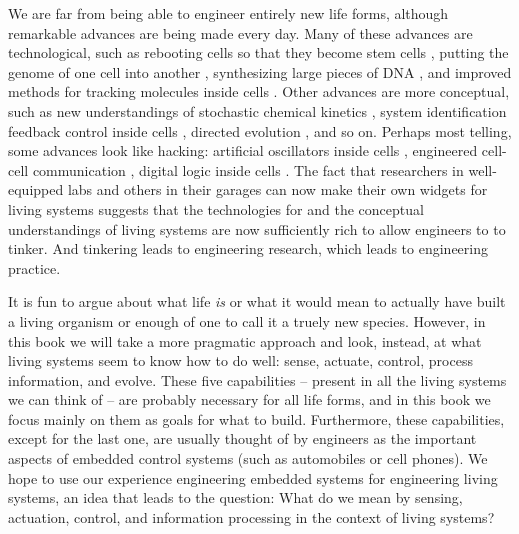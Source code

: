 We are far from being able to engineer entirely new life forms,
although remarkable advances are being made every day. Many of these
advances are technological, such as rebooting cells so that they
become stem cells \cite{reprogramming}, putting the genome of one cell
into another \cite{cloning}, synthesizing large pieces of DNA
\cite{m-genetalium}, and improved methods for tracking molecules
inside cells \cite{fret-in-cells}. Other advances are more conceptual,
such as new understandings of stochastic chemical kinetics
\cite{khammash-fsp,el-samad-stochastic}, system identification feedback
control inside cells \cite{avano-osmotic}, directed evolution
\cite{alon}, and so on. Perhaps most telling, some advances look like
hacking: artificial oscillators inside cells
\cite{elowitz-repressilator}, engineered cell-cell communication
\cite{weiss-communicate}, digital logic inside cells
\cite{weiss-logic}. The fact that researchers in well-equipped labs
and others in their garages \cite{diy} can now make their own widgets
for living systems suggests that the technologies for and the
conceptual understandings of living systems are now sufficiently rich
to allow engineers to to tinker. And tinkering leads to engineering
research, which leads to engineering practice.

It is fun to argue about what life {\em is} or what it would mean to
actually have built a living organism or enough of one to call it a
truely new species. However, in this book we will take a more
pragmatic approach and look, instead, at what living systems seem to
know how to do well: sense, actuate, control, process information, and
evolve. These five capabilities -- present in all the living systems
we can think of -- are probably necessary for all life forms, and in
this book we focus mainly on them as goals for what to
build. Furthermore, these capabilities, except for the last one, are
usually thought of by engineers as the important aspects of embedded
control systems (such as automobiles or cell phones). We hope to use
our experience engineering embedded systems for engineering living
systems, an idea that leads to the question: What do we mean by
sensing, actuation, control, and information processing in the context
of living systems?

%
%  
